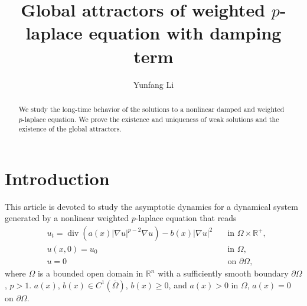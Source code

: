 \documentclass[11pt]{amsart}
\title[Attractor of $p$-laplace equation]{Global attractors of weighted $p$-laplace equation with damping term}
\author[Y. Li]{Yunfang Li}
\theoremstyle{definition}
\numberwithin{equation}{section}
\newcommand*\abs[1]{\lvert#1\rvert}
\newcommand\R{\mathbb{R}}
\DeclareMathOperator{\Div}{div}
\begin{document}
\begin{abstract}
	We study the long-time behavior of the solutions to a nonlinear damped and weighted $p$-laplace equation. We prove the
	existence and uniqueness of weak solutions and the existence
	of the global attractors.
\end{abstract}

\maketitle

\section{Introduction}
This article is devoted to study the asymptotic dynamics for a dynamical system generated by a nonlinear
weighted $p$-laplace equation that reads
\begin{equation}\label{eq:main}
\begin{alignedat}{2}
& u_t = \Div(a(x)\abs{\nabla u}^{p-2}\nabla u) - b(x)\abs{\nabla u}^2 \quad &\text{in } \Omega \times \R^+,\\
& u(x,0) = u_0 \quad &\text{in } \Omega,\\
& u = 0 \quad &\text{on } \partial\Omega,
\end{alignedat}
\end{equation}
where $\Omega$ is a bounded open domain in $\R^{n}$ with a sufficiently smooth boundary $\partial\Omega$, $p>1$.
$ a(x)$, $b(x) \in C^1(\bar{\Omega}) $, $b(x) \geq 0$, and $a(x) > 0$ in $\Omega$, $a(x) = 0$ on $\partial\Omega$.
\end{document}
